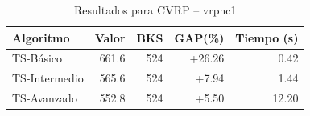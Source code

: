 \begin{table}[h]
\centering
\caption{Resultados para CVRP -- vrpnc1}
\label{tab:vrp_vrpnc1}
\begin{tabular}{lrrrr}
\hline
\textbf{Algoritmo} & \textbf{Valor} & \textbf{BKS} & \textbf{GAP(\%)} & \textbf{Tiempo (s)} \\
\hline
TS-Básico & 661.6 & 524 & +26.26 & 0.42 \\
TS-Intermedio & 565.6 & 524 & +7.94 & 1.44 \\
TS-Avanzado & 552.8 & 524 & +5.50 & 12.20 \\
\hline
\end{tabular}
\end{table}
